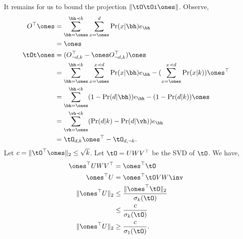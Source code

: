 It remains for us to bound the projection $\|\tO \tOi \ones\|$. Observe,
 \begin{align*}
   O^\top \ones 
     &= \sum_{\bh = \ones}^{\bh \prec k} \sum_{x = \ones}^{d} \Pr(x | \bh) e_\bh  \\
     &= \ones \\
   \tOt \ones
       &= (O_{\neg d, k}^\top - \ones O_{\neg d, k}^\top) \ones  \\
       &= \sum_{\bh = \ones}^{\bh \prec k} \sum_{x = \ones}^{x \prec d} \Pr(x | \bh) e_\bh - (\sum_{x = \ones}^{x \prec d} \Pr(x | k)) \ones^\top  \\
       &= \sum_{\bh = \ones}^{\bh \prec k} (1 - \Pr(d | \bh)) e_\bh - (1 - \Pr(d | k)) \ones  \\
       &= \sum_{\vh = \ones}^{\vh \prec k} (\Pr(d | k) - \Pr(d | \vh))e_\bh \\
       &= \tO_{d,k} \ones^\top - \tO_{d,\neg k}.
 \end{align*}
 Let $c = \|\tO^\top \ones\|_2 \le \sqrt{k}$.
 Let $\tO = U W V^\top$ be the SVD of $\tO$. We have,
 \begin{align*}
   \ones^\top U W V^\top 
       &= \ones^\top \tO \\
   \ones^\top U 
     &= \ones^\top \tO V W\inv \\
   \|\ones^\top U\|_2 
       &\le \frac{\|\ones^\top \tO\|_2}{\sigma_{k}(\tO)} \\
       &\le \frac{c}{\sigma_{k}(\tO)} \\
   \|\ones^\top U\|_2 
       &\ge \frac{c}{\sigma_{1}(\tO)}.
 \end{align*}


